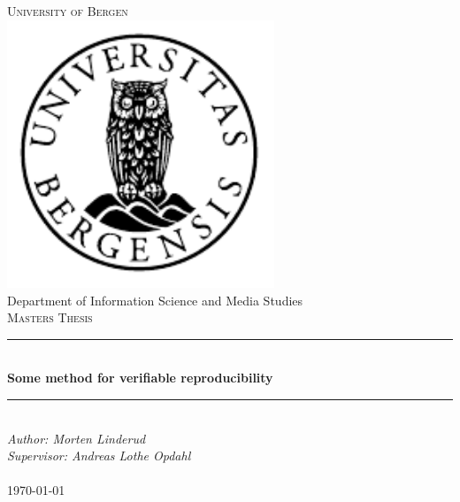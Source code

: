\documentclass[../Main/thesis.tex]{subfiles}
\begin{document}

\newcommand{\HRule}{\rule{\linewidth}{0.5mm}}

\begin{titlepage}
\begin{center}
\textsc{\Huge University of Bergen}\\[0.4cm]
\includegraphics[width=8cm]{../fig/uib} \\[0.5cm]

\large Department of Information Science and Media Studies\\[0.7cm]
\textsc{\huge Masters Thesis}\\[0.4cm]
\HRule \\[0.4cm]
{ \huge \bfseries Some method for verifiable reproducibility}\\[0.5cm]
\HRule \\[1.0cm]

\emph{Author: Morten Linderud}\\
\emph{Supervisor: Andreas Lothe Opdahl}\\

\paragraph*{}
\end{center}
\vfill
\begin{center}
{\large \today}
\end{center}
\end{titlepage}
\end{document}
